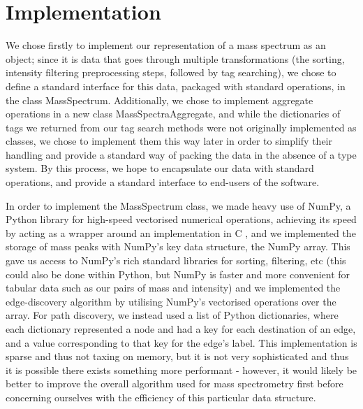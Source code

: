 \documentclass{l4proj}
\newcommand{\cit}[1]{\citep{#1}}
\begin{document}
\section{Implementation} \label{implementation}

We chose firstly to implement our representation of a mass spectrum as an object; since it is data that goes through multiple transformations (the sorting, intensity filtering preprocessing steps, followed by tag searching), we chose to define a standard interface for this data, packaged with standard operations, in the class MassSpectrum. Additionally, we chose to implement aggregate operations in a new class MassSpectraAggregate, and while the dictionaries of tags we returned from our tag search methods were not originally implemented as classes, we chose to implement them this way later in order to simplify their handling and provide a standard way of packing the data in the absence of a type system. By this process, we hope to encapsulate our data with standard operations, and provide a standard interface to end-users of the software.

In order to implement the MassSpectrum class, we made heavy use of NumPy, a Python library for high-speed vectorised numerical operations, achieving its speed by acting as a wrapper around an implementation in C \cit{k&r}, and we implemented the storage of mass peaks with NumPy's key data structure, the NumPy array. This gave us access to NumPy's rich standard libraries for sorting, filtering, etc (this could also be done within Python, but NumPy is faster and more convenient for tabular data such as our pairs of mass and intensity) and we implemented the edge-discovery algorithm by utilising NumPy's vectorised operations over the array. For path discovery, we instead used a list of Python dictionaries, where each dictionary represented a node and had a key for each destination of an edge, and a value corresponding to that key for the edge's label. This implementation is sparse and thus not taxing on memory, but it is not very sophisticated and thus it is possible there exists something more performant - however, it would likely be better to improve the overall algorithm used for mass spectrometry first before concerning ourselves with the efficiency of this particular data structure.
\end{document}

